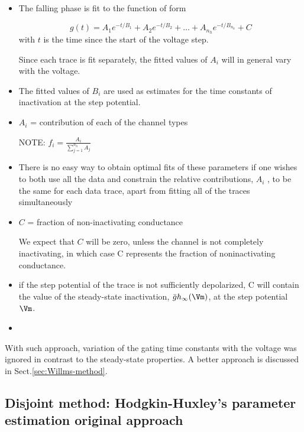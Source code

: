 \begin{itemize}
  \item  The falling phase is fit to the function of form

\begin{equation}
g(t) = A_1 e^{-t/B_1}  + A_2 e^{-t/B_2}  + \ldots + A_{n_h} e^{-t/B_{n_h}} + C
\end{equation}
with $t$ is the time since the start of the voltage step.

Since each trace is fit separately, the fitted values of $A_i$ will in general
vary with the voltage.

   \item The fitted values of $B_i$ are used as estimates for the time constants
   of inactivation at the step potential.

   \item $A_i$ = contribution of each of the channel types

 NOTE: $f_i = \frac{A_i}{\sum_{j=1}^{n_h} A_j}$

   \item
There is no easy way to obtain optimal
fits of these parameters if one wishes to both use
all the data and constrain the relative contributions, $A_i$ ,
to be the same for each data trace, apart from fitting all
of the traces simultaneously

  \item $C$ = fraction of non-inactivating conductance

We expect that $C$ will be zero, unless the channel is not completely
inactivating, in which case C represents the fraction of noninactivating
conductance.

  \item if the step potential of the trace is not sufficiently depolarized, C
  will contain the value of the steady-state inactivation,
  $\bar{g}h_\infty(\Vm)$, at the step potential $\Vm$.

  \item
\end{itemize}

With such approach, variation of the gating time constants with the voltage was
ignored in contrast to the steady-state properties. A better approach is
discussed in Sect.\ref{sec:Willms-method}.

\subsection{Disjoint method: Hodgkin-Huxley's parameter estimation original
approach}
\label{sec:Hodgkin-Huxley-method}
\label{sec:disjoint-method-HH}

